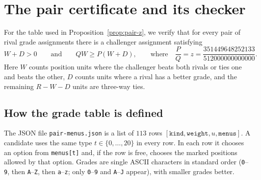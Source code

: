 \documentclass[11pt,letterpaper]{article}
\renewcommand{\sectionmark}[1]{\markright{\thesection\enspace #1}}
\theoremstyle{cleanthm}
\newcommand{\jointnum}{351449648252133}
\newcommand{\jointden}{512000000000000}
\begin{document}

\appendix
\clearpage
\renewcommand{\sectionmark}[1]{\markright{Appendix \thesection\enspace #1}}
\section[The pair certificate]{The pair certificate and its checker}\label{sec:certificate}

For the table used in Proposition~\ref{prop:pair-z}, we verify that for every pair of rival grade
assignments there is a challenger assignment satisfying
\begin{equation}\label{eq:cert-ineq}
 W+D>0 \qquad\text{and}\qquad QW \ge P(W+D),
 \qquad\text{where}\quad
 \frac{P}{Q}=z=\frac{\jointnum}{\jointden}.
\end{equation}
Here \(W\) counts position units where the challenger beats both rivals or ties one and beats the
other, \(D\) counts units where a rival has a better grade, and the remaining \(R-W-D\) units are
three-way ties.

\subsection{How the grade table is defined}

The JSON file \texttt{pair-menus.json} is a list of \(113\) rows
\([\texttt{kind}, \texttt{weight}, u, \texttt{menus}]\). A candidate uses the same type
\(t\in\{0,\ldots,20\}\) in every row. In each row it chooses an option from \texttt{menus[t]} and,
if the row is free, chooses the marked positions allowed by that option. Grades are single ASCII
characters in standard order (\texttt{0}--\texttt{9}, then \texttt{A}--\texttt{Z}, then
\texttt{a}--\texttt{z}; only \texttt{0}--\texttt{9} and \texttt{A}--\texttt{J} appear), with
smaller grades better.
\end{document}
